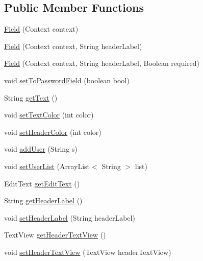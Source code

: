 \subsection*{Public Member Functions}
\begin{DoxyCompactItemize}
\item 
\hyperlink{classcom_1_1example_1_1loginui_1_1_field_aa5cc967e6f141e0e728a5a448997ae58}{Field} (Context context)
\item 
\hyperlink{classcom_1_1example_1_1loginui_1_1_field_a6e41db5fee5b1751d72af468fc687c7a}{Field} (Context context, String header\+Label)
\item 
\hyperlink{classcom_1_1example_1_1loginui_1_1_field_a02848d9ec2081b327cdb72c132bdf53c}{Field} (Context context, String header\+Label, Boolean required)
\item 
void \hyperlink{classcom_1_1example_1_1loginui_1_1_field_af925595be581e2067e5c0ca7b277f720}{set\+To\+Password\+Field} (boolean bool)
\item 
String \hyperlink{classcom_1_1example_1_1loginui_1_1_field_a50781c5d55fc5761088389c785b99b10}{get\+Text} ()
\item 
void \hyperlink{classcom_1_1example_1_1loginui_1_1_field_a4180d16f564047874c10b272a98c6d0d}{set\+Text\+Color} (int color)
\item 
void \hyperlink{classcom_1_1example_1_1loginui_1_1_field_a6303573051de4a300516af847c883637}{set\+Header\+Color} (int color)
\item 
void \hyperlink{classcom_1_1example_1_1loginui_1_1_field_a7de08a942a8e6240ef010bb56fd674d4}{add\+User} (String s)
\item 
void \hyperlink{classcom_1_1example_1_1loginui_1_1_field_a00e2ba079216104afcf883996db5bed3}{set\+User\+List} (Array\+List$<$ String $>$ list)
\item 
Edit\+Text \hyperlink{classcom_1_1example_1_1loginui_1_1_field_ae1dc2a039ad6fd306c45478d313eaaa5}{get\+Edit\+Text} ()
\item 
String \hyperlink{classcom_1_1example_1_1loginui_1_1_field_acaf75004b06097d8b064f5d30c2a49c6}{get\+Header\+Label} ()
\item 
void \hyperlink{classcom_1_1example_1_1loginui_1_1_field_a539592eabb209f82d58482bff8de5c31}{set\+Header\+Label} (String header\+Label)
\item 
Text\+View \hyperlink{classcom_1_1example_1_1loginui_1_1_field_a3ac22f766a73cb8b782dcfce5ace8002}{get\+Header\+Text\+View} ()
\item 
void \hyperlink{classcom_1_1example_1_1loginui_1_1_field_ae283fc5f4d7351e88503a7bccfa9705f}{set\+Header\+Text\+View} (Text\+View header\+Text\+View)

\end{DoxyCompactItemize}

